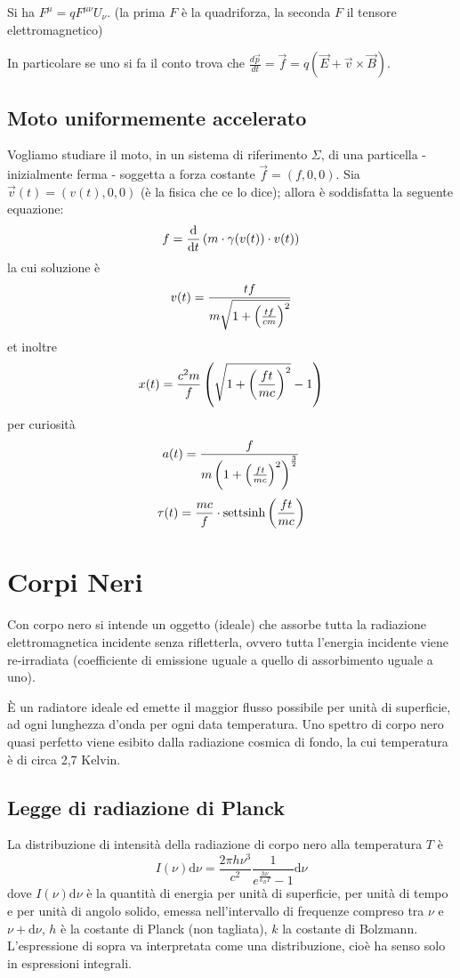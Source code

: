 \documentclass[10pt,a4paper]{article}
\newcommand{\de}{{\ensuremath{ \mbox{d}}}}
\begin{document}
\begin{multicols}{2}
  Si ha $F^{\mu}=qF^{\mu\nu}U_{\nu}$. (la prima $F$ è la quadriforza, la seconda $F$ il tensore elettromagnetico)
  
  In particolare se uno si fa il conto trova che $\frac{d\vec{p}}{dt}=\vec{f}=q\left(\vec{E}+\vec{v}\times\vec{B}\right)$.
  
  \subsection*{Moto uniformemente accelerato}
  Vogliamo studiare il moto, in un sistema di riferimento $\Sigma$, di una particella - inizialmente ferma - soggetta a forza costante $\vec f = (f, 0, 0)$. Sia $\vec v(t) = (v(t), 0, 0)$ (è la fisica che ce lo dice); allora è soddisfatta la seguente equazione:
  $$ f = \ded{}{t} \lrt{m \cdot \gamma(v(t)) \cdot v(t)} $$
  la cui soluzione è
  $$ v(t) = \frac{t f}{m \sqrt{1 + \left({\frac{t f}{cm}}\right)^2}} $$
  et inoltre
  $$ x(t) = \frac{c^2 m}{f} \left({\sqrt{1 + \left({\frac{ft}{mc}}\right)^2} - 1}\right) $$
  per curiosità
  $$ a(t) = \frac{f}{m \left({1 + \left({\frac{ft}{mc}}\right)^2}\right)^{\frac{3}{2}}} $$
  $$ \tau(t) = \frac{mc}{f} \cdot \text{settsinh}\left({\frac{ft}{mc}}\right) $$

  \clearpage
  \section*{Corpi Neri}
  Con corpo nero si intende un oggetto (ideale) che assorbe tutta la radiazione elettromagnetica incidente senza rifletterla, ovvero tutta l'energia incidente viene re-irradiata (coefficiente di emissione uguale a quello di assorbimento uguale a uno).

  È un radiatore ideale ed emette il maggior flusso possibile per unità di superficie, ad ogni lunghezza d'onda per ogni data temperatura. Uno spettro di corpo nero quasi perfetto viene esibito dalla radiazione cosmica di fondo, la cui temperatura è di circa 2,7 Kelvin.

  \subsection*{Legge di radiazione di Planck}
  La distribuzione di intensità della radiazione di corpo nero alla temperatura $T$ è
  $$ I(\nu) \de \nu = \frac{2 \pi h \nu^3}{c^2} \frac{1}{e^{\frac{h\nu}{k_B T}} - 1} \de \nu $$
  dove $I(\nu) \de \nu$ è la quantità di energia per unità di superficie, per unità di tempo e per unità di angolo solido, emessa nell'intervallo di frequenze compreso tra $\nu$ e $\nu + \de \nu$, $h$ è la costante di Planck (non tagliata), $k$ la costante di Bolzmann. L'espressione di sopra va interpretata come una distribuzione, cioè ha senso solo in espressioni integrali.


\end{multicols}
\end{document}
